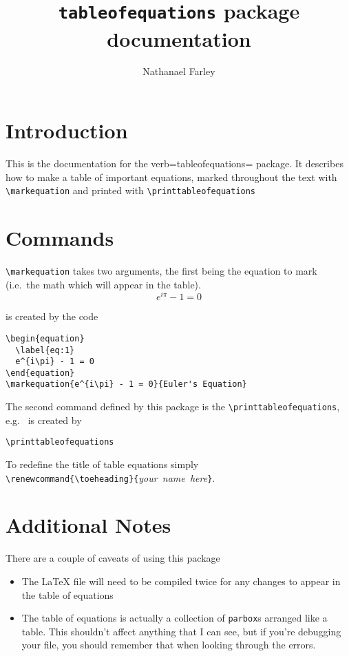\documentclass{article}
\begin{document}
\title{\texttt{tableofequations} package documentation}
\author{Nathanael Farley}
\maketitle

\section{Introduction}
\label{sec:introduction}

This is the documentation for the verb=tableofequations= package. It describes how to make a table of important equations, marked throughout the text with \verb=\markequation= and printed with \verb=\printtableofequations=

\section{Commands}
\label{sec:commands}

\verb=\markequation= takes two arguments, the first being the equation to mark (i.e.\ the math which will appear in the table).
\begin{equation}
  \label{eq:1}
  e^{i\pi} - 1 = 0
\end{equation}

is created by the code
\begin{verbatim}
\begin{equation}
  \label{eq:1}
  e^{i\pi} - 1 = 0
\end{equation}
\markequation{e^{i\pi} - 1 = 0}{Euler's Equation}
\end{verbatim}

The second command defined by this package is the \verb=\printtableofequations=, e.g.\ 
\printtableofequations
is created by
\begin{verbatim}
\printtableofequations
\end{verbatim}

To redefine the title of table equations simply\\ \verb=\renewcommand{\toeheading}{=\emph{\mbox{your name here}}\verb=}=.
\section{Additional Notes}
\label{sec:additional-notes}

There are a couple of caveats of using this package
\begin{itemize}
\item The LaTeX file will need to be compiled twice for any changes to appear in the table of equations
\item The table of equations is actually a collection of \verb=parbox=s arranged like a table. This shouldn't affect anything that I can see, but if you're debugging your file, you should remember that when looking through the errors.
\end{itemize}
\end{document}

